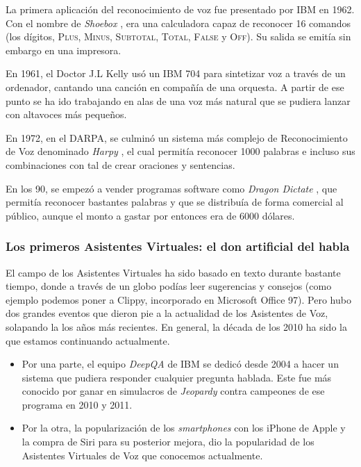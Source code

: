La primera aplicación del reconocimiento de voz fue presentado por IBM en 1962. Con el nombre de \textit{Shoebox} \cite{shoebox}, era una calculadora capaz de reconocer 16 comandos (los dígitos, \textsc{Plus}, \textsc{Minus}, \textsc{Subtotal}, \textsc{Total}, \textsc{False} y \textsc{Off}). Su salida se emitía sin embargo en una impresora.

En 1961, el Doctor J.L Kelly usó un IBM 704 para sintetizar voz a través de un ordenador, cantando una canción en compañía de una orquesta. A partir de ese punto se ha ido trabajando en alas de una voz más natural que se pudiera lanzar con altavoces más pequeños.

En 1972, en el DARPA, se culminó un sistema más complejo de Reconocimiento de Voz denominado \textit{Harpy} \cite{harpy}, el cual permitía reconocer 1000 palabras e incluso sus combinaciones con tal de crear oraciones y sentencias.

En los 90, se empezó a vender programas software como \textit{Dragon Dictate} \cite{dragon-dictate}, que permitía reconocer bastantes palabras y que se distribuía de forma comercial al público, aunque el monto a gastar por entonces era de 6000 dólares.

\subsubsection{Los primeros Asistentes Virtuales: el don artificial del habla}

El campo de los Asistentes Virtuales ha sido basado en texto durante bastante tiempo, donde a través de un globo podías leer sugerencias y consejos (como ejemplo podemos poner a Clippy, incorporado en 	Microsoft Office 97). Pero hubo dos grandes eventos que dieron pie a la actualidad de los Asistentes de Voz, solapando la los años más recientes. En general, la década de los 2010 ha sido la que estamos continuando actualmente.

\begin{itemize}
	\item Por una parte, el equipo \textit{DeepQA} de IBM \cite{deepqa} se dedicó desde 2004 a hacer un sistema que pudiera responder cualquier pregunta hablada. Este fue más conocido por ganar en simulacros de \textit{Jeopardy} contra campeones de ese programa en 2010 y 2011.
	\item Por la otra, la popularización de los \textit{smartphones} con los iPhone de Apple y la compra de Siri para su posterior mejora, dio la popularidad de los Asistentes Virtuales de Voz que conocemos actualmente.
\end{itemize}

